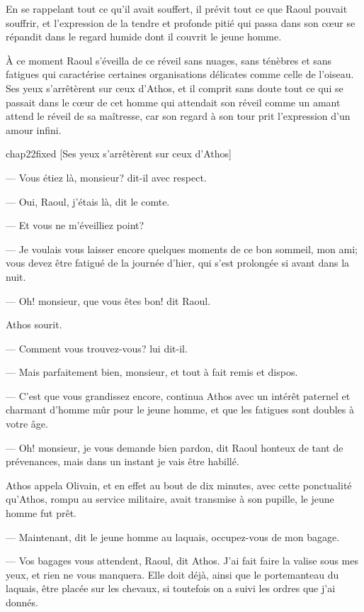 En se rappelant tout ce qu'il avait souffert, il prévit tout ce que Raoul pouvait souffrir, et l'expression de la tendre et profonde pitié qui passa dans son cœur se répandit dans le regard humide dont il couvrit le jeune homme.

À ce moment Raoul s'éveilla de ce réveil sans nuages, sans ténèbres et sans fatigues qui caractérise certaines organisations délicates comme celle de l'oiseau. Ses yeux s'arrêtèrent sur ceux d'Athos, et il comprit sans doute tout ce qui se passait dans le cœur de cet homme qui attendait son réveil comme un amant attend le réveil de sa maîtresse, car son regard à son tour prit l'expression d'un amour infini.

\begin{bwbigpic}
	[\basicscale] 
	{chap22fixed}
	[Ses yeux s'arrêtèrent sur ceux d'Athos]
\end{bwbigpic}

— Vous étiez là, monsieur? dit-il avec respect.

— Oui, Raoul, j'étais là, dit le comte.

— Et vous ne m'éveilliez point?

— Je voulais vous laisser encore quelques moments de ce bon sommeil, mon ami; vous devez être fatigué de la journée d'hier, qui s'est prolongée si avant dans la nuit.

— Oh! monsieur, que vous êtes bon! dit Raoul.

Athos sourit.

— Comment vous trouvez-vous? lui dit-il.

— Mais parfaitement bien, monsieur, et tout à fait remis et dispos.

— C'est que vous grandissez encore, continua Athos avec un intérêt paternel et charmant d'homme mûr pour le jeune homme, et que les fatigues sont doubles à votre âge.

— Oh! monsieur, je vous demande bien pardon, dit Raoul honteux de tant de prévenances, mais dans un instant je vais être habillé.

Athos appela Olivain, et en effet au bout de dix minutes, avec cette ponctualité qu'Athos, rompu au service militaire, avait transmise à son pupille, le jeune homme fut prêt.

— Maintenant, dit le jeune homme au laquais, occupez-vous de mon bagage.

— Vos bagages vous attendent, Raoul, dit Athos. J'ai fait faire la valise sous mes yeux, et rien ne vous manquera. Elle doit déjà, ainsi que le portemanteau du laquais, être placée sur les chevaux, si toutefois on a suivi les ordres que j'ai donnés.

